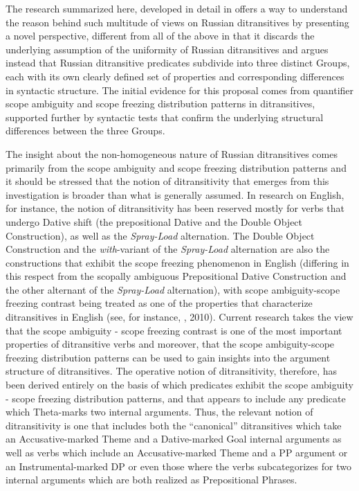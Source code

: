 \documentclass[output=paper,modfonts, nonflat]{langsci/langscibook}
\begin{document}
The research summarized here, developed in detail in \citet{Antonyuk2015} offers a way to understand the reason behind such multitude of views on Russian ditransitives by presenting a novel perspective, different from all of the above in that it discards the underlying assumption of the uniformity of Russian ditransitives and argues instead that Russian ditransitive predicates subdivide into three distinct Groups, each with its own clearly defined set of properties and corresponding differences in syntactic structure. The initial evidence for this proposal comes from quantifier scope ambiguity and scope freezing distribution patterns in ditransitives, supported further by syntactic tests that confirm the underlying structural differences between the three Groups.

The insight about the non-homogeneous nature of Russian ditransitives comes primarily from the scope ambiguity and scope freezing distribution patterns and it should be stressed that the notion of ditransitivity that emerges from this investigation is broader than what is generally assumed. In research on English, for instance, the notion of ditransitivity has been reserved mostly for verbs that undergo Dative shift (the prepositional Dative and the Double Object Construction), as well as the \textit{Spray-Load} alternation. The Double Object Construction and the \textit{with}{}-variant of the \textit{Spray-Load} alternation are also the constructions that exhibit the scope freezing phenomenon in English (differing in this respect from the scopally ambiguous Prepositional Dative Construction and the other alternant of the \textit{Spray-Load} alternation), with scope ambiguity-scope freezing contrast being treated as one of the properties that characterize ditransitives in English (see, for instance, \citealt{Bruening2001}, 2010). Current research takes the view that the scope ambiguity - scope freezing contrast is one of the most important properties of ditransitive verbs and moreover, that the scope ambiguity-scope freezing distribution patterns can be used to gain insights into the argument structure of ditransitives. The operative notion of ditransitivity, therefore, has been derived entirely on the basis of which predicates exhibit the scope ambiguity - scope freezing distribution patterns, and that appears to include any predicate which Theta-marks two internal arguments. Thus, the relevant notion of ditransitivity is one that includes both the “canonical” ditransitives which take an Accusative-marked Theme and a Dative-marked Goal internal arguments as well as verbs which include an Accusative-marked Theme and a PP argument or an Instrumental-marked DP or even those where the verbs subcategorizes for two internal arguments which are both realized as Prepositional Phrases. 
\end{document}
